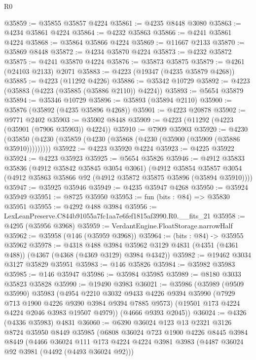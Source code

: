 \begin{lexlean}{R0}
\begin{coremodule}
@35859 := @35855 @35857 @4224
@35861 := @4235 @8448 @3080
@35863 := @4234 @35861 @4224
@35864 := @4232 @35863
@35866 := @4241 @35861 @4224
@35868 := @35864 @35866 @4224
@35869 := @11667 @2133
@35870 := @35869 @8448
@35872 := @4234 @35870 @4224
@35873 := @4232 @35872
@35875 := @4241 @35870 @4224
@35876 := @35873 @35875
@35879 := @4261 (@24103 @2133) @2071
@35883 := @4223 (@19347 (@4235 @35879 @4268))
@35885 := @4223 (@11292 @4226)
@35886 := @35342 @10729
@35892 := @4223 (@35883 (@4223 (@35885 (@35886 @2110)) @4224))
@35893 := @5654 @35879
@35894 := @35346 @10729
@35896 := @35893 (@35894 @2110)
@35900 := @35876 (@35892 (@4235 @35896 @4268))
@35901 := @4223 @20878
@35902 := @9771 @2402
@35903 := @35902 @8448
@35909 := @4223 (@11292 (@4223 (@35901 (@7906 @35903)) @4224))
@35910 := @7909 @35903
@35920 := @4230 (@35850 (@4230 (@35859 (@4230 (@35868 (@4230 (@35900 (@35909 (@35886 @35910)))))))))
@35922 := @4223 @35920 @4224
@35923 := @4225 @35922
@35924 := @4223 @35923
@35925 := @5654 @35826
@35946 := @4912
    @35833
    @35836
    (@4912 @35842 @35845 @3054 @3061)
    (@4912
      @35854
      @35857
      @3054
      (@4912 @35863 @35866 @92 (@4912 @35872 @35875 @35896 (@35894 @35910))))
@35947 := @35925 @35946
@35949 := @4235 @35947 @4268
@35950 := @35924 @35949
@35951 := @8725 @35950
@35953 := fun (bits : @84) => @35830 @35951
@35955 := @4292 @488 @3984
@35956 := LexLeanPreserve.C844b91055a7fc1aa7e6fef1815af3990.R0.__fits_21
@35958 := @4295 (@35956 @3968)
@35959 := VerdantEngine.FloatStorage.narrowHalf
@35962 := @35958 (@146 (@35959 @3968))
@35964 := (bits : @84) -> @35955 @35962
@35978 := @4318
    @488
    @3984
    @35962
    @3129
    @4831
    (@4351 (@4361 @488))
    (@4367 (@4368 (@4369 @3129) @3984 @4342))
@35982 := @19462 @3034 @3127 @35829 @35951
@35983 := @146 @35826
@35984 := @35982 @35983
@35985 := @146 @35947
@35986 := @35984 @35985
@35989 := @8180 @3033 @35823 @35828
@35990 := @19490 @3983
@36021 := @35986
    (@35989
      (@9509 @35990)
      @35983
      (@4954
        @2210
        @3032
        @9433
        @4226
        @9394
        @35990
        (@7929 @713 @1900 @4226 @9390 @3984 @9394 @7885 @9573)
        (@19501 @173 @4224 @4224 @2046 @3983 @19507 @4979))
      (@4666 @9393 @2045))
@36024 := @4326 (@4336 @35983) @4831
@36060 := @6390
    @36024
    @123
    @13
    @2321
    @3126
    @8724
    @35950
    @8449
    @35985
    (@6808
      @36024
      @723
      @1900
      @4226
      @8445
      @3984
      @8449
      (@4466
        @36024
        @111
        @173
        @4224
        @4224
        @3981
        @3983
        (@4487 @36024 @92 @3981 (@4492 (@4493 @36024 @92)))

\end{coremodule}
\end{lexlean}
